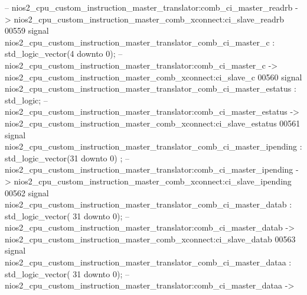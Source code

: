 \begin{DoxyCode}
{                   -- nios2\_cpu\_custom\_instruction\_master\_translator:comb\_ci\_master\_readrb ->
       nios2\_cpu\_custom\_instruction\_master\_comb\_xconnect:ci\_slave\_readrb}
00559     \textcolor{keywordflow}{signal} \textcolor{vhdlchar}{nios2_cpu_custom_instruction_master_translator_comb_ci_master_c}             \textcolor{vhdlchar}{:} \textcolor{comment}{std\_logic\_vector}\textcolor{vhdlchar}{(}\textcolor{vhdllogic}{}\textcolor{vhdllogic}{4}
       \textcolor{keywordflow}{downto} \textcolor{vhdllogic}{}\textcolor{vhdllogic}{0}\textcolor{vhdlchar}{)};\textcolor{keyword}{  -- nios2\_cpu\_custom\_instruction\_master\_translator:comb\_ci\_master\_c ->
       nios2\_cpu\_custom\_instruction\_master\_comb\_xconnect:ci\_slave\_c}
00560     \textcolor{keywordflow}{signal} \textcolor{vhdlchar}{nios2_cpu_custom_instruction_master_translator_comb_ci_master_estatus}       \textcolor{vhdlchar}{:} \textcolor{comment}{std\_logic};\textcolor{keyword}{        
                   -- nios2\_cpu\_custom\_instruction\_master\_translator:comb\_ci\_master\_estatus ->
       nios2\_cpu\_custom\_instruction\_master\_comb\_xconnect:ci\_slave\_estatus}
00561     \textcolor{keywordflow}{signal} \textcolor{vhdlchar}{
      nios2_cpu_custom_instruction_master_translator_comb_ci_master_ipending}      \textcolor{vhdlchar}{:} \textcolor{comment}{std\_logic\_vector}\textcolor{vhdlchar}{(}\textcolor{vhdllogic}{}\textcolor{vhdllogic}{31} \textcolor{keywordflow}{downto} \textcolor{vhdllogic}{}\textcolor{vhdllogic}{0}\textcolor{vhdlchar}{)}
      ;\textcolor{keyword}{ -- nios2\_cpu\_custom\_instruction\_master\_translator:comb\_ci\_master\_ipending ->
       nios2\_cpu\_custom\_instruction\_master\_comb\_xconnect:ci\_slave\_ipending}
00562     \textcolor{keywordflow}{signal} \textcolor{vhdlchar}{nios2_cpu_custom_instruction_master_translator_comb_ci_master_datab}         \textcolor{vhdlchar}{:} \textcolor{comment}{std\_logic\_vector}\textcolor{vhdlchar}{(}\textcolor{vhdllogic}{}\textcolor{vhdllogic}{
      31} \textcolor{keywordflow}{downto} \textcolor{vhdllogic}{}\textcolor{vhdllogic}{0}\textcolor{vhdlchar}{)};\textcolor{keyword}{ -- nios2\_cpu\_custom\_instruction\_master\_translator:comb\_ci\_master\_datab ->
       nios2\_cpu\_custom\_instruction\_master\_comb\_xconnect:ci\_slave\_datab}
00563     \textcolor{keywordflow}{signal} \textcolor{vhdlchar}{nios2_cpu_custom_instruction_master_translator_comb_ci_master_dataa}         \textcolor{vhdlchar}{:} \textcolor{comment}{std\_logic\_vector}\textcolor{vhdlchar}{(}\textcolor{vhdllogic}{}\textcolor{vhdllogic}{
      31} \textcolor{keywordflow}{downto} \textcolor{vhdllogic}{}\textcolor{vhdllogic}{0}\textcolor{vhdlchar}{)};\textcolor{keyword}{ -- nios2\_cpu\_custom\_instruction\_master\_translator:comb\_ci\_master\_dataa ->
}
\end{DoxyCode}
